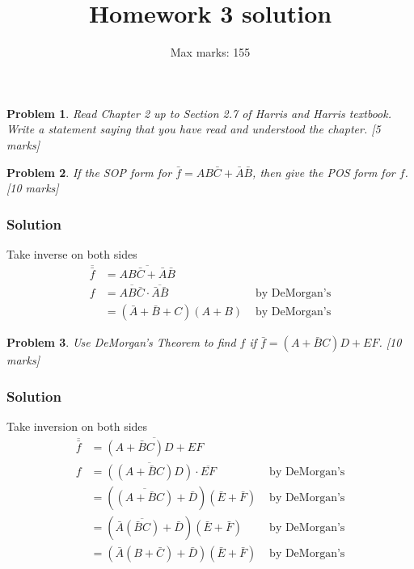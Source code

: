 \documentclass{article}
\title{Homework 3  solution}
\author{Max marks: 155}
\newtheorem{prob}{Problem}
\newcommand{\bA}{\bar{A}}
\newcommand{\bB}{\bar{B}}
\newcommand{\bC}{\bar{C}}
\begin{document}
\maketitle

\begin{prob}
  Read Chapter 2 up to Section 2.7 of Harris and Harris textbook. Write a statement saying that you have read and understood the chapter. [5 marks]
\end{prob}

\begin{prob}
If the SOP form for $ \bar{f} = AB\bC+\bA\bB$, then give the POS form for
$f$. [10 marks]
\end{prob}
\subsubsection*{Solution}

Take inverse on both sides
\begin{align*}
  \overline{\bar{f}} &= \overline{AB\bC+\bA\bB} &
  \\
  f  &= \overline{AB\bC} \cdot \overline{\bA\bB} & \text{ by DeMorgan's}
  \\
    &= (\bA + \bB + C) (A + B) & \text{ by DeMorgan's}
\end{align*}

\begin{prob}
Use DeMorgan's Theorem to find $f$  if  $\bar{f} = (A + \bB C)D + EF$. [10 marks]
\end{prob}

\subsubsection*{Solution}
Take inversion on both sides
\begin{align*}
  \overline{\bar{f}} &= \overline{(A+\bB C)D + EF} &
  \\
  f  &= \overline{((A+\bB C)D)} \cdot \overline{EF} & \text{ by DeMorgan's}
  \\
  &= (\overline{(A+\bB C)} + \bar{D}) (\bar{E}+\bar{F}) & \text{ by DeMorgan's}
  \\
  &= (\bA\overline{(\bB C)} + \bar{D}) (\bar{E}+\bar{F}) & \text{ by DeMorgan's}
  \\
  &= (\bA(B + \bC) + \bar{D}) (\bar{E}+\bar{F}) & \text{ by DeMorgan's}
\end{align*}
\end{document}
